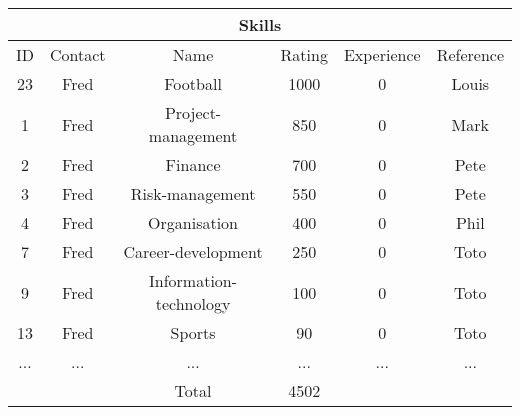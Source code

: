 \begin{longtable}{|c|c|c|c|c|c|}
\hline
\multicolumn{6}{|c|}{Skills} \\
\hline
ID & Contact & Name & Rating & Experience & Reference\\
\hline
23 & Fred & Football & 1000 & 0 & Louis\\
\hline
1 & Fred & Project-management & 850 & 0 & Mark\\
\hline
2 & Fred & Finance & 700 & 0 & Pete\\
\hline
3 & Fred & Risk-management & 550 & 0 & Pete\\
\hline
4 & Fred & Organisation & 400 & 0 & Phil\\
\hline
7 & Fred & Career-development & 250 & 0 & Toto\\
\hline
9 & Fred & Information-technology & 100 & 0 & Toto\\
\hline
13 & Fred & Sports & 90 & 0 & Toto\\
\hline
 ... & ... & ... & ... & ... & ... \\
\hline
 & & Total & 4502 &  & \\
\hline
\end{longtable}
